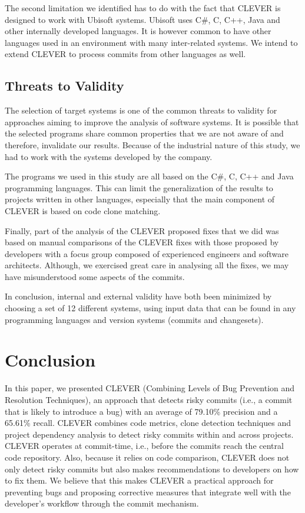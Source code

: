 \documentclass[sigconf]{acmart}
\begin{document}
The second limitation we identified has to do with the fact that CLEVER
is designed to work with Ubisoft systems. Ubisoft uses C\#, C, C++, Java
and other internally developed languages. It is however common to have
other languages used in an environment with many inter-related systems.
We intend to extend CLEVER to process commits from other languages as
well.

\subsection{Threats to Validity}\label{threats-to-validity}

The selection of target systems is one of the common threats to validity
for approaches aiming to improve the analysis of software systems. It is
possible that the selected programs share common properties that we are
not aware of and therefore, invalidate our results. Because of the
industrial nature of this study, we had to work with the systems
developed by the company.

The programs we used in this study are all based on the C\#, C, C++ and
Java programming languages. This can limit the generalization of the
results to projects written in other languages, especially that the main
component of CLEVER is based on code clone matching.

Finally, part of the analysis of the CLEVER proposed fixes that we did
was based on manual comparisons of the CLEVER fixes with those proposed
by developers with a focus group composed of experienced engineers and
software architects. Although, we exercised great care in analysing all
the fixes, we may have misunderstood some aspects of the commits.

In conclusion, internal and external validity have both been minimized
by choosing a set of 12 different systems, using input data that can be
found in any programming languages and version systems (commits and
changesets).

\section{Conclusion}\label{sec:conclusion}

In this paper, we presented CLEVER (Combining Levels of Bug Prevention
and Resolution Techniques), an approach that detects risky commits
(i.e., a commit that is likely to introduce a bug) with an average of
79.10\% precision and a 65.61\% recall. CLEVER combines code metrics,
clone detection techniques and project dependency analysis to detect
risky commits within and across projects. CLEVER operates at
commit-time, i.e., before the commits reach the central code repository.
Also, because it relies on code comparison, CLEVER does not only detect
risky commits but also makes recommendations to developers on how to fix
them. We believe that this makes CLEVER a practical approach for
preventing bugs and proposing corrective measures that integrate well
with the developer's workflow through the commit mechanism.
\end{document}
